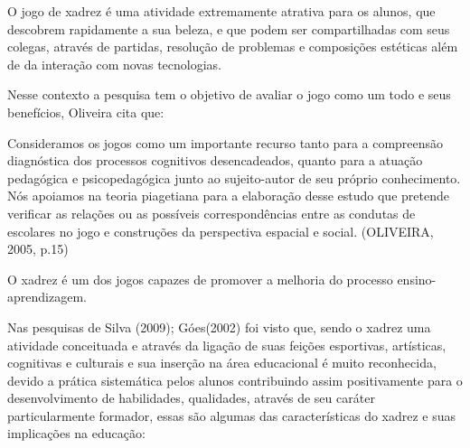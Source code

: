 \documentclass[article,12pt,onesidea,4paper,english,brazil]{abntex2}
\begin{document}
	O jogo de xadrez é uma atividade extremamente atrativa para os alunos, que descobrem rapidamente a sua beleza, e que podem ser compartilhadas com seus colegas, através de partidas, resolução de problemas e composições estéticas além de da interação com novas tecnologias.
	
	Nesse contexto a pesquisa tem o objetivo de avaliar o jogo como um todo e seus benefícios, Oliveira cita que:
	
	\begin{citacao}
Consideramos os jogos como um importante recurso tanto para a compreensão diagnóstica dos processos cognitivos desencadeados, quanto para a atuação pedagógica e psicopedagógica junto ao sujeito-autor de seu próprio conhecimento. Nós apoiamos na teoria piagetiana para a elaboração desse estudo que pretende verificar as relações ou as possíveis correspondências entre as condutas de escolares no jogo e construções da perspectiva espacial e social. (OLIVEIRA, 2005, p.15)

	\end{citacao}

O xadrez é um dos jogos capazes de promover a melhoria do processo ensino-aprendizagem.

Nas pesquisas de Silva (2009); Góes(2002) foi visto que, sendo o xadrez uma atividade conceituada e através da ligação de suas feições esportivas, artísticas, cognitivas e culturais e sua inserção na área educacional é muito reconhecida, devido a prática sistemática pelos alunos contribuindo assim positivamente para o desenvolvimento de habilidades, qualidades, através de seu caráter particularmente formador, essas são algumas das características do xadrez e suas implicações na educação:
\end{document}

